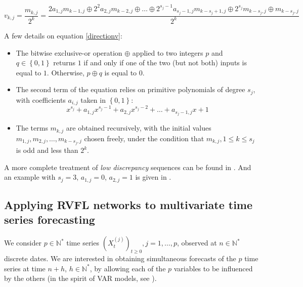 \begin{equation}
\label{directionv}
v_{k, j} = \frac{m_{k, j}}{2^k} = \frac{2 a_{1, j} m_{k-1, j} \oplus 2^2 a_{2, j}m_{k-2, j} \oplus \ldots \oplus 2^{s_j - 1} a_{s_j - 1, j}m_{k-s_j+1, j} \oplus 2^{s_j} m_{k-s_j, j} \oplus m_{k-s_j, j}   }{2^k}
\end{equation}

A few details on equation \ref{directionv}:

\begin{itemize}
\item The bitwise exclusive-or operation $\oplus$ applied to two integers $p$ and $q \in \left \lbrace 0, 1 \right \rbrace$ returns $1$ if and only if one of the two (but not both) inputs is equal to $1$. Otherwise, $p \oplus q$ is equal to 0.
\item The second term of the equation relies on primitive polynomials of degree $s_j$, with coefficients $a_{i, j}$ taken in $\left \lbrace 0, 1 \right \rbrace$:
\begin{equation}
\label{primitivepoly}
x^{s_j} + a_{1, j} x^{s_j - 1} + a_{2, j} x^{s_j - 2} + \ldots + a_{s_j - 1, j} x + 1
\end{equation}
\item The terms $m_{k, j}$ are obtained recursively, with the initial values  $m_{1, j}, m_{2, j}, \ldots, m_{k - s_j, j}$ chosen freely, under the condition that $m_{k, j}, 1 \leq k \leq s_j$ is odd and less than $2^k$.
\end{itemize}

A more complete treatment of \textit{low discrepancy} sequences can be found in \cite{niederreiter1992random}. And an example with $s_j = 3$, $a_{1, j} = 0$, $a_{2, j} = 1$ is given in \cite{joe2008sobol}.

\subsection{Applying RVFL networks to multivariate time series forecasting}
\label{apply_rvfl}

We consider $p \in \mathbb{N}^*$ time series $(X_t^{(j)})_{t \geq 0}, j = 1, \ldots, p$,
observed at $n \in \mathbb{N}^*$ discrete dates. We are interested in
obtaining simultaneous forecasts of the $p$ time series at time $n+h$, $h \in
\mathbb{N}^*$, by allowing each of the $p$ variables to be influenced by the
others (in the spirit of VAR models, see \cite{lutkepohl2005new}).

\medskip

